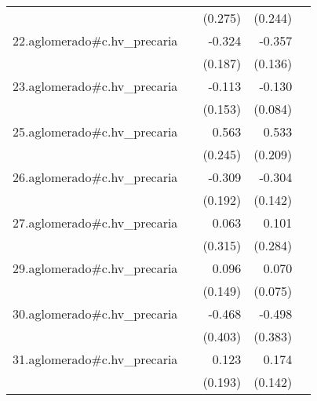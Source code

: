 {\begin{longtable}{l*{4}{D{.}{.}{-1}}}
            &                     &     (0.275)         &     (0.244)         &                     \\
\addlinespace
22.aglomerado#c.hv\_precaria&                     &      -0.324         &      -0.357\sym{**} &                     \\
            &                     &     (0.187)         &     (0.136)         &                     \\
\addlinespace
23.aglomerado#c.hv\_precaria&                     &      -0.113         &      -0.130         &                     \\
            &                     &     (0.153)         &     (0.084)         &                     \\
\addlinespace
25.aglomerado#c.hv\_precaria&                     &       0.563\sym{*}  &       0.533\sym{*}  &                     \\
            &                     &     (0.245)         &     (0.209)         &                     \\
\addlinespace
26.aglomerado#c.hv\_precaria&                     &      -0.309         &      -0.304\sym{*}  &                     \\
            &                     &     (0.192)         &     (0.142)         &                     \\
\addlinespace
27.aglomerado#c.hv\_precaria&                     &       0.063         &       0.101         &                     \\
            &                     &     (0.315)         &     (0.284)         &                     \\
\addlinespace
29.aglomerado#c.hv\_precaria&                     &       0.096         &       0.070         &                     \\
            &                     &     (0.149)         &     (0.075)         &                     \\
\addlinespace
30.aglomerado#c.hv\_precaria&                     &      -0.468         &      -0.498         &                     \\
            &                     &     (0.403)         &     (0.383)         &                     \\
\addlinespace
31.aglomerado#c.hv\_precaria&                     &       0.123         &       0.174         &                     \\
            &                     &     (0.193)         &     (0.142)         &                     \\

\end{longtable}}
